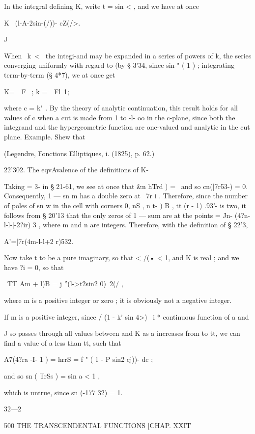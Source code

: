 In the integral defining K, write t = sin < , and we have at once

K \ (l-A-2sin-(/))- cZ(/>.

J

When \ k\ < \, the integi-and may be expanded in a series of powers of
k, the series converging uniformly with regard to (by § 3'34, since
sin-" ( 1 ) ; integrating term-by-term (§ 4*7), we at once get

K=\ \ F \, ; k =\ \ Fl\, 1;



where c = k" . By the theory of analytic continuation, this result
holds for all values of c when a cut is made from 1 to -l- oo in the
c-plane, since both the integrand and the hypergeometric function are
one-valued and analytic in the cut plane. Example. Shew that

(Legendre, Fonctions Elliptiques, i. (1825), p. 62.)

22'302. The eqvAvalence of the definitions of K-

Taking = 3- in § 21-61, we see at once that \&n hTrd ) = \ and so
cn(|7r53-) = 0. Consequently, 1 — sn m has a double zero at \ 7r i .
Therefore, since the number of poles of sn w in the cell with corners
0, nS , n t- ) B , tt (r - 1) .93'- is two, it follows from § 20'13
that the only zeros of 1 — sum are at the points = Jn-
(4?n-l-l-|-2?ir) 3 , where m and n are integers. Therefore, with the
definition of § 22'3,

A'=|7r(4m-l-l+2 r)532.

Now take t to be a pure imaginary, so that < /(• < 1, and K is real ;
and we have ?i = 0, so that

\ TT Am + l)B = j ''(l->t2sin2 0)~2(/ ,

where m is a positive integer or zero ; it is obviously not a negative
integer.

If m is a positive integer, since / (1 - k' sin 4>)~ i * continuous
function of a and

J so passes through all values between and K as a increases from to
tt, we can find a value of a less than tt, such that

A7(4?ra -I- 1 ) = hrrS = f " ( 1 - P sin2 cj))- dc ;

and so sn ( TrSs ) = sin a < 1 ,

which is untrue, since sn (-177 32) = 1.

32—2



500 THE TRANSCENDENTAL FUNCTIONS [CHAP. XXIT

